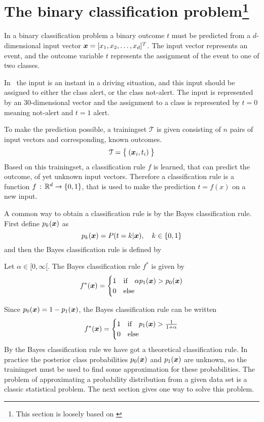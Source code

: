 \section[The binary classification problem]{The binary classification problem\protect\footnote{This section is loosely based on \citet[sec 22.1-22.2]{wasserman04}}}
In a binary classification problem a binary outcome $t$ must be predicted from a $d$-dimensional input vector $\boldsymbol{x}=[x_1, x_2, \dots, x_d]^T$. The input vector represents an event, and the outcome variable $t$ represents the assignment of the event to one of two classes.
\begin{Exa}
    In \TFC\ the input is an instant in a driving situation, and this input should be assigned to either the class alert, or the class not-alert. The input is represented by an 30-dimensional vector and the assignment to a class is represented by $t=0$ meaning not-alert and $t=1$ alert.
\end{Exa}
To make the prediction possible, a trainingset $\mathcal{T}$ is given consisting of $n$ pairs of input vectors and corresponding, known outcomes.
\[
    \mathcal{T} = \bigl\{\:(\boldsymbol{x}_i, t_i)\:\bigr\}
\]
Based on this trainingset, a classification rule $f$ is learned, that can predict the outcome, of yet unknown input vectors. Therefore a classification rule is a function $f\,:\,\mathbb{R}^d\to\{0,1\}$, that is used to make the prediction $t=f(x)$ on a new input. \par
A common way to obtain a classification rule is by the Bayes classification rule. First define $p_k(\boldsymbol{x})$ as
    \[
        p_k(\boldsymbol{x}) = P(t=k|\boldsymbol{x}),\quad k\in\{0,1\}
    \]
    and then the Bayes classification rule is defined by
    \begin{definition}\label{def:bayes-rule}
        Let $\alpha\in[0,\infty[$. The Bayes classification rule $f^*$ is given by
        \[
            f^*(\boldsymbol{x}) = \begin{cases}
                1 & \text{if}\quad \alpha p_1(\boldsymbol{x})>p_0(\boldsymbol{x}) \\
                0 & \text{else}
            \end{cases}
        \]
    \end{definition}
    Since $p_0(\boldsymbol{x})=1-p_1(\boldsymbol{x})$, the Bayes classification rule can be written
    \[
        f^*(\boldsymbol{x}) = \begin{cases}
            1 & \text{if}\quad p_1(\boldsymbol{x}) > \frac{1}{1+\alpha} \\
            0 & \text{else}
        \end{cases}
    \]
    By the Bayes classification rule we have got a theoretical classification rule. In practice the posterior class probabilities $p_0(\boldsymbol{x})$ and $p_1(\boldsymbol{x})$ are unknown, so the trainingset must be used to find some approximation for these probabilities. The problem of approximating a probability distribution from a given data set is a classic statistical problem. The next section gives one way to solve this problem.

